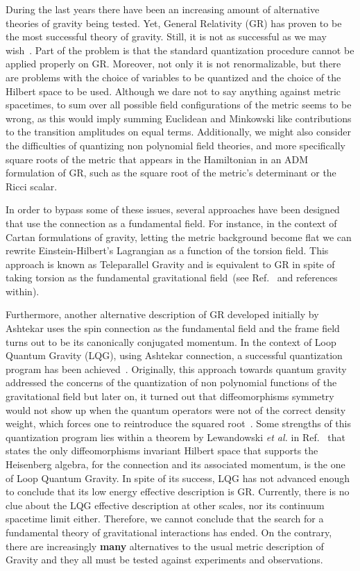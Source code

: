 \documentclass[twocolumn,aps,
  showpacs,showkeys,prd,superscriptaddress]{revtex4-1}
\newcommand{\hl}[1]{{\color{red} \textbf{#1}}}
\begin{document}
During the last years there have been an increasing amount of alternative theories of gravity being tested. Yet, General Relativity (GR) has proven to be the most successful theory of gravity.  Still,  it is not as successful as we may wish~\cite{Kiefer:2013jqa}. Part of the problem is that the standard quantization procedure cannot be applied  properly on GR. Moreover, not only it is not renormalizable, but there are  problems with the choice of variables to be quantized and the choice of the Hilbert space to be used. Although we dare not to say anything against metric spacetimes, to sum over all possible field configurations of the metric seems to be wrong, as this would imply summing Euclidean and Minkowski like contributions to the transition amplitudes on equal terms. Additionally, we might also consider the difficulties of  quantizing  non polynomial field theories, and more specifically square roots of the metric that appears in the Hamiltonian in an ADM formulation of GR, such as the square root of the metric's determinant or the Ricci scalar.

In order to bypass some of these issues, several approaches have been designed that use the connection as a fundamental field. For instance, in the context of Cartan formulations of gravity, letting the metric background become flat we can rewrite Einstein-Hilbert's Lagrangian as a function of the torsion field. This approach is known as Teleparallel Gravity and is equivalent to GR in spite of taking torsion as the fundamental gravitational field~(see Ref.~\cite{Teleparallel,Baez:2012bn} and references within).

Furthermore, another alternative description of GR developed initially by Ashtekar uses the spin connection as the fundamental field and the frame field turns out to be its canonically conjugated momentum. In the context of Loop Quantum Gravity (LQG), using Ashtekar connection, a successful quantization program has been achieved~\cite{Ashtekar:2004eh,thiemann2007loop}. Originally, this approach towards quantum gravity addressed the concerns of the quantization of non polynomial functions of the gravitational field but later on, it turned out that diffeomorphisms symmetry would not show up when the quantum operators were not of the correct density weight, which forces one to reintroduce the squared root~\cite{Thiemann:1996aw}.  Some  strengths of this quantization program lies within a theorem by Lewandowski \emph{et al.} in Ref.~\cite{Lewandowski:2005jk} that states the only diffeomorphisms invariant Hilbert space that supports the Heisenberg algebra, for the connection and its associated momentum, is the one of Loop Quantum Gravity. In spite of its success, LQG has not advanced enough to conclude that its low energy effective description is GR. Currently, there is no clue about the LQG effective description at other scales,  nor its continuum spacetime limit either. Therefore, we cannot conclude that the search for a fundamental theory of gravitational interactions has ended. On the contrary, there are increasingly \hl{many} alternatives to the usual metric description of Gravity and they all must be tested against experiments and observations.
\end{document}
